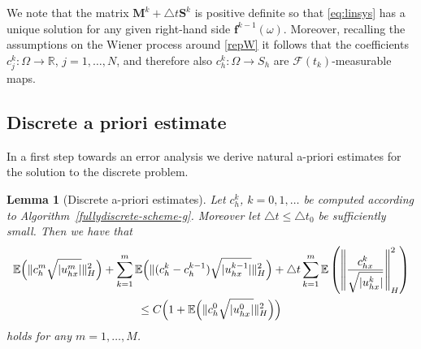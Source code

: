 \documentclass[a4paper,10pt]{article}
\newtheorem{lemma}[cor]{Lemma}
\newcommand{\R}{\mathbb{R}}
\def\bbb{\boldsymbol}
\numberwithin{equation}{section}
\begin{document}
We note that the matrix $\bbb{M}^{k} + \triangle t \bbb{S}^{k}$ is positive definite so that
\eqref{eq:linsys} has a unique solution for any given right-hand side $\bbb{f}^{k-1}(\omega)$.
Moreover, recalling the assumptions on the Wiener process around \eqref{repW} 
it follows that the coefficients
$c^{k}_{j}: \Omega \to \R$, $j=1, \ldots, N$, and therefore also $c^{k}_{h} : \Omega \to S_{h}$ are $\mathcal{F}(t_{k})$-measurable maps.


\subsection{Discrete a priori estimate}

In a first step towards an error analysis we derive natural a-priori estimates for the solution to the discrete problem.

\begin{lemma}[Discrete a-priori estimates]\label{dis-apriori-g}
Let $c_{h}^{k}$, $k=0,1, \ldots$ be computed according to Algorithm~\ref{fullydiscrete-scheme-g}.
Moreover let $\triangle t \leq \triangle t_{0} $ be sufficiently small.
Then we have that
\begin{multline*}
\mathbb{E}\Big{(}\| c_{h}^{m} \sqrt{|u^{m}_{hx}|}\|^{2}_{H}\Big{)}
+ \sum_{k=1}^{m} \mathbb{E} \Big{(}\| (c_{h}^{k}-c_{h}^{k-1}) \sqrt{|u^{k-1}_{hx}|}\|^{2}_{H}\Big{)}
+ \triangle t \sum_{k=1}^{m} \mathbb{E} \left ( \left \| \frac{ c^{k}_{hx}}{\sqrt{|u^{k}_{hx}|}} \right \|^{2}_{H} \right ) \\
\leq C \Big{(}1 + \mathbb{E}\Big{(}\| c_{h}^{0}\sqrt{ |u^{0}_{hx}|}\|^{2}_{H}\Big{)} \Big{)}
\end{multline*}
holds for any $m =1, \ldots, M$.
\end{lemma}
\end{document}
